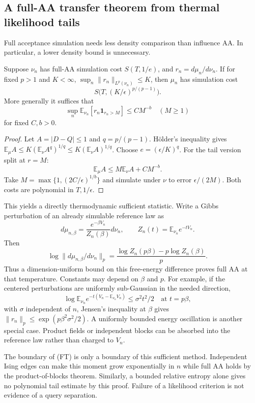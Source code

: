 \subsection{A full-AA transfer theorem from thermal likelihood tails}
\label{tht:density}

Full acceptance simulation needs less density comparison than influence
AA. In particular, a lower density bound is unnecessary.

\begin{proposition}
\label{tht:density-prop}
Suppose $\nu_n$ has full-AA simulation cost $S(T,1/e)$, and
$r_n=d\mu_n/d\nu_n$. If for fixed $p>1$ and $K<\infty$,
$\sup_n\|r_n\|_{L^p(\nu_n)}\le K$, then $\mu_n$ has simulation cost
\[
 S\bigl(T,(K/\epsilon)^{p/(p-1)}\bigr).
\]
More generally it suffices that
\[
 \sup_n\mathbb E_{\nu_n}[r_n\mathbf1_{r_n>M}]
 \le C M^{-b}\quad(M\ge1)
\]
for fixed $C,b>0$.
\end{proposition}

\begin{proof}
Let $A=|D-Q|\le1$ and $q=p/(p-1)$. H\"older's inequality gives
$\mathbb E_\mu A\le K(\mathbb E_\nu A^q)^{1/q}
\le K(\mathbb E_\nu A)^{1/q}$.
Choose $e=(\epsilon/K)^q$. For the tail version split at $r=M$:
\[
 \mathbb E_\mu A\le M\mathbb E_\nu A+C M^{-b}.
\]
Take $M=\max\{1,(2C/\epsilon)^{1/b}\}$ and simulate under $\nu$ to
error $\epsilon/(2M)$. Both costs are polynomial in $T,1/\epsilon$.
\end{proof}

This yields a directly thermodynamic sufficient statistic. Write a
Gibbs perturbation of an already simulable reference law as
\[
 d\mu_{n,\beta}=\frac{e^{-\beta V_n}}{Z_n(\beta)}d\nu_n,
 \qquad Z_n(t)=\mathbb E_{\nu_n}e^{-tV_n}.
\]
Then
\[
 \log\|d\mu_{n,\beta}/d\nu_n\|_p
 =\frac{\log Z_n(p\beta)-p\log Z_n(\beta)}p.
 \tag{FT}
\]
Thus a dimension-uniform bound on this free-energy difference proves
full AA at that temperature. Constants may depend on $\beta$ and $p$.
For example, if the centered perturbations are uniformly sub-Gaussian
in the needed direction,
\[
 \log\mathbb E_{\nu_n}e^{-t(V_n-\mathbb E_{\nu_n}V_n)}
 \le\sigma^2t^2/2\quad\text{at }t=p\beta,
\]
with $\sigma$ independent of $n$, Jensen's inequality at $\beta$ gives
$\|r_n\|_p\le\exp(p\beta^2\sigma^2/2)$. A uniformly bounded energy
oscillation is another special case. Product fields or independent
blocks can be absorbed into the reference law rather than charged to
$V_n$.

The boundary of (FT) is only a boundary of this sufficient method.
Independent Ising edges can make this moment grow exponentially in $n$
while full AA holds by the product-of-blocks theorem. Similarly, a
bounded relative entropy alone gives no polynomial tail estimate by
this proof. Failure of a likelihood criterion is not evidence of a
query separation.

